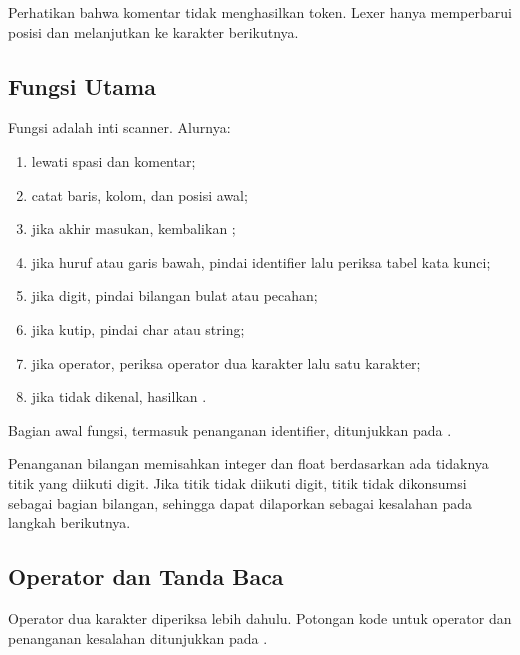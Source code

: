 
Perhatikan bahwa komentar tidak menghasilkan token. Lexer hanya
memperbarui posisi dan melanjutkan ke karakter berikutnya.

\subsection{Fungsi Utama }

Fungsi  adalah inti scanner. Alurnya:
\begin{enumerate}[label=\arabic*.,leftmargin=*]
  \item lewati spasi dan komentar;
  \item catat baris, kolom, dan posisi awal;
  \item jika akhir masukan, kembalikan ;
  \item jika huruf atau garis bawah, pindai identifier lalu periksa
        tabel kata kunci;
  \item jika digit, pindai bilangan bulat atau pecahan;
  \item jika kutip, pindai char atau string;
  \item jika operator, periksa operator dua karakter lalu satu
        karakter;
  \item jika tidak dikenal, hasilkan .
\end{enumerate}

Bagian awal fungsi, termasuk penanganan identifier, ditunjukkan pada
.


Penanganan bilangan memisahkan integer dan float berdasarkan ada
tidaknya titik yang diikuti digit. Jika titik tidak diikuti digit,
titik tidak dikonsumsi sebagai bagian bilangan, sehingga dapat
dilaporkan sebagai kesalahan pada langkah berikutnya.

\subsection{Operator dan Tanda Baca}

Operator dua karakter diperiksa lebih dahulu. Potongan kode untuk
operator dan penanganan kesalahan ditunjukkan pada
.

